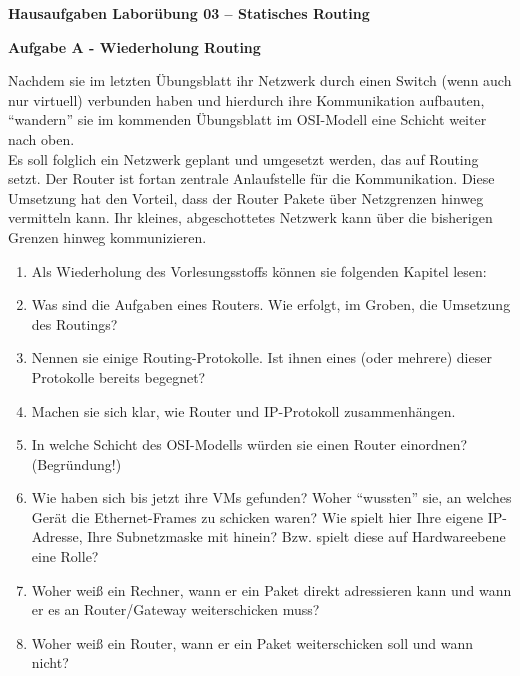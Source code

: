 \documentclass[paper=a4,fontsize=11pt]{scrartcl}%
\numberwithin{equation}{section}
\begin{document}
\begin{center}
\Large{\textbf{Hausaufgaben Laborübung 03 -- Statisches Routing}}
\end{center}
\begin{center}\Large{\textbf{Aufgabe A - Wiederholung Routing}}
\end{center}\vskip0.25in
Nachdem sie im letzten Übungsblatt ihr Netzwerk durch einen Switch (wenn auch nur virtuell) verbunden haben und hierdurch ihre Kommunikation aufbauten, \enquote{wandern} sie im kommenden Übungsblatt im OSI-Modell eine Schicht weiter nach oben.\\
Es soll folglich ein Netzwerk geplant und umgesetzt werden, das auf Routing setzt. Der Router ist fortan zentrale Anlaufstelle für die Kommunikation. Diese Umsetzung hat den Vorteil, dass der Router Pakete über Netzgrenzen hinweg vermitteln kann. Ihr kleines, abgeschottetes Netzwerk kann über die bisherigen Grenzen hinweg kommunizieren.
\begin{enumerate}
	\item Als Wiederholung des Vorlesungsstoffs können sie folgenden Kapitel lesen: \cite[Kap. 4.1, 4.3]{Kurose2012}
	\item Was sind die Aufgaben eines Routers. Wie erfolgt, im Groben, die Umsetzung des Routings?
	\item Nennen sie einige Routing-Protokolle. Ist ihnen eines (oder mehrere) dieser Protokolle bereits begegnet?
	\item Machen sie sich klar, wie Router und IP-Protokoll zusammenhängen.
	\item In welche Schicht des OSI-Modells würden sie einen Router einordnen? (Begründung!)
	\item Wie haben sich bis jetzt ihre VMs gefunden? Woher \enquote{wussten} sie, an welches Gerät die Ethernet-Frames zu schicken waren? Wie spielt hier Ihre eigene IP-Adresse, Ihre Subnetzmaske mit hinein? Bzw. spielt diese auf Hardwareebene eine Rolle?
	\item Woher weiß ein Rechner, wann er ein Paket direkt adressieren kann und wann er es an Router/Gateway weiterschicken muss?
	\item Woher weiß ein Router, wann er ein Paket weiterschicken soll und wann nicht?
\end{enumerate}
\end{document}
